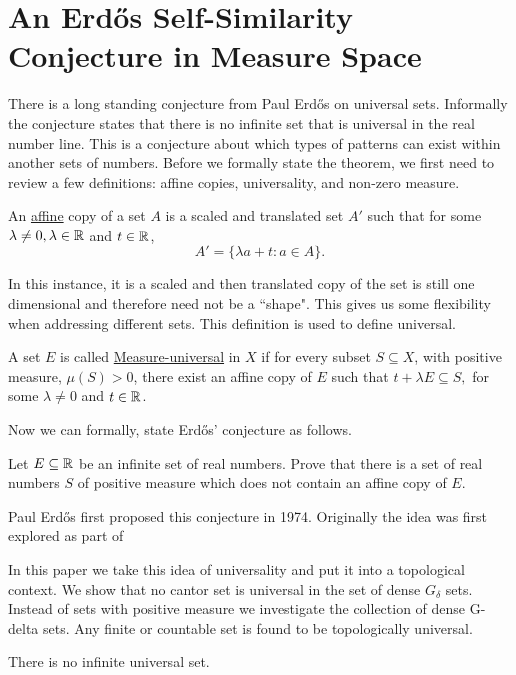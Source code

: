 \section{An Erd\H{o}s Self-Similarity Conjecture in Measure Space}
There is a long standing conjecture from Paul Erd\H{o}s on universal sets.  Informally the conjecture states that there is no infinite set that is universal in the real number line.  This is a conjecture about which types of  patterns can exist within another sets of numbers.  Before we formally state the theorem, we first need to review a few definitions: affine copies, universality, and non-zero measure. 
\begin{definition}
    An \underline{affine} copy of a set $A$ is a scaled and translated set $A'$ such that for some $\lambda\neq 0, \lambda \in \mathbb{R}$ and $t \in \mathbb{R}$,  $$A' = \{\lambda a + t : a \in A\}.$$
\end{definition}
In this instance, it is a scaled and then translated copy of the set is still one dimensional and therefore need not be a ``shape".  This gives us some flexibility when addressing different sets.  This definition is used to define universal. 

\begin{definition}
    A set $E$ is called \underline{Measure-universal} in $X$ if for every subset $S \subseteq X$, with positive measure, $\mu (S) > 0$, there exist an affine copy of $E$ such that $t+\lambda E \subseteq S,$ for some $\lambda \neq 0$ and $t \in \mathbb{R}$.  
\end{definition}

Now we can formally, state Erd\H{o}s' conjecture as follows. 

\begin{conjecture}\label{ErdConj}
    Let $E\subseteq \mathbb{R}$ be an infinite set of real numbers.  Prove that there is a set of real numbers $S$ of positive measure which does not contain an affine copy of $E$.  
\end{conjecture}

Paul Erd\H{o}s first proposed this conjecture in 1974.  Originally the idea was first explored as part of 

In this paper we take this idea of universality and put it into a topological context.  We show that no cantor set is universal in the set of dense $G_\delta$ sets.  Instead of sets with positive measure we investigate the collection of dense G-delta sets.  Any finite or countable set is found to be topologically universal. 


\begin{conjecture}
    There is no infinite universal set. 
\end{conjecture}

